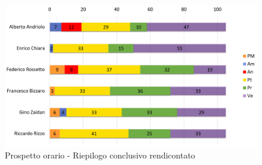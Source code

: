 \begin{figure}[H]
	\centering
	\includegraphics[width= 14cm]{immagini/rend_istogramma.png}
	\caption{Prospetto orario - Riepilogo conclusivo rendicontato}
\end{figure}
\newpage

